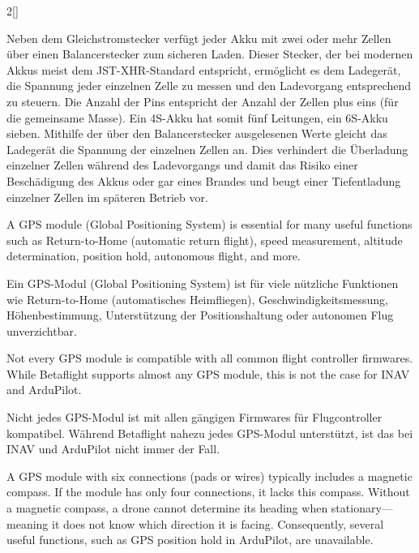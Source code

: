 \begin{paracol}{2}[]
\colger

Neben dem Gleichstromstecker verfügt jeder Akku mit zwei oder mehr Zellen über einen Balancerstecker zum sicheren Laden. Dieser Stecker, der bei modernen Akkus meist dem JST-XHR-Standard entspricht, ermöglicht es dem Ladegerät, die Spannung jeder einzelnen Zelle zu messen und den Ladevorgang entsprechend zu steuern. Die Anzahl der Pins entspricht der Anzahl der Zellen plus eins (für die gemeinsame Masse). Ein 4S-Akku hat somit fünf Leitungen, ein 6S-Akku sieben. Mithilfe der über den Balancerstecker ausgelesenen Werte gleicht das Ladegerät die Spannung der einzelnen Zellen an. Dies verhindert die Überladung einzelner Zellen während des Ladevorgangs und damit das Risiko einer Beschädigung des Akkus oder gar eines Brandes und beugt einer Tiefentladung einzelner Zellen im späteren Betrieb vor.

\colende

\renewcommand{\deutschertitel}{GPS}
\renewcommand{\englischertitel}{GPS}
\makroabschnitt
\label{AbschnittGPS}

A GPS module (Global Positioning System) is essential for many useful functions such as Return-to-Home (automatic return flight), speed measurement, altitude determination, position hold, autonomous flight, and more.

\colger

Ein GPS-Modul (Global Positioning System) ist für viele nützliche Funktionen wie Return-to-Home (automatisches Heimfliegen), Geschwindigkeitsmessung, Höhenbestimmung, Unterstützung der Positionshaltung oder autonomen Flug unverzichtbar.

\coleng

Not every GPS module is compatible with all common flight controller firmwares. While Betaflight supports almost any GPS module, this is not the case for INAV and ArduPilot.

\colger

Nicht jedes GPS-Modul ist mit allen gängigen Firmwares für Flugcontroller kompatibel. Während Betaflight nahezu jedes GPS-Modul unterstützt, ist das bei INAV und ArduPilot nicht immer der Fall.

\coleng

A GPS module with six connections (pads or wires) typically includes a magnetic compass. If the module has only four connections, it lacks this compass. Without a magnetic compass, a drone cannot determine its heading when stationary—meaning it does not know which direction it is facing. Consequently, several useful functions, such as GPS position hold in ArduPilot, are unavailable.


\end{paracol}
